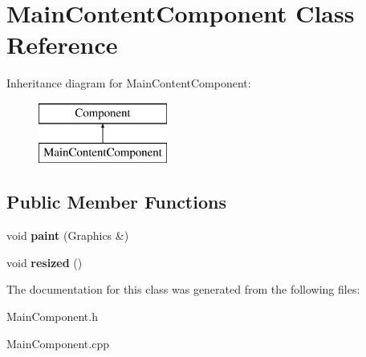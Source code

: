 \hypertarget{class_main_content_component}{\section{Main\-Content\-Component Class Reference}
\label{class_main_content_component}
}
Inheritance diagram for Main\-Content\-Component\-:\begin{figure}[H]
\begin{center}
\leavevmode
\includegraphics[height=2.000000cm]{class_main_content_component}
\end{center}
\end{figure}
\subsection*{Public Member Functions}
\begin{DoxyCompactItemize}
\item 
\hypertarget{class_main_content_component_a897ff27920dedae2b120fe4e6a198815}{void {\bfseries paint} (Graphics \&)}\label{class_main_content_component_a897ff27920dedae2b120fe4e6a198815}

\item 
\hypertarget{class_main_content_component_a42ef2312ea53596306779503fdce5992}{void {\bfseries resized} ()}\label{class_main_content_component_a42ef2312ea53596306779503fdce5992}

\end{DoxyCompactItemize}


The documentation for this class was generated from the following files\-:\begin{DoxyCompactItemize}
\item 
Main\-Component.\-h\item 
Main\-Component.\-cpp\end{DoxyCompactItemize}
